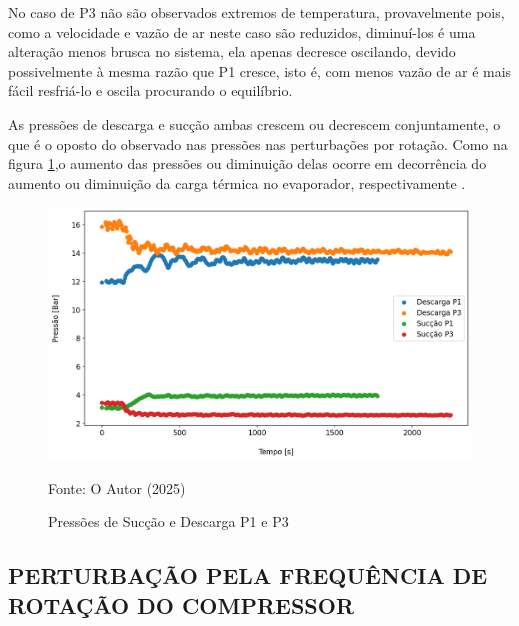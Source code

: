 No caso de P3 não são observados extremos de temperatura, provavelmente pois, como a velocidade e vazão de ar neste caso são reduzidos, diminuí-los é uma alteração menos brusca no sistema, ela apenas decresce oscilando, devido possivelmente à mesma razão que P1 cresce, isto é, com menos vazão de ar é mais fácil resfriá-lo e oscila procurando o equilíbrio.

As pressões de descarga e sucção ambas crescem ou decrescem conjuntamente, o que é o oposto do observado nas pressões nas perturbações por rotação. Como na figura \ref{fig:Pressões de Sucção e Descarga P1 e P3},o aumento das pressões ou diminuição delas ocorre em decorrência do aumento ou diminuição da carga térmica no evaporador, respectivamente \cite{EffectsOFRefrigeranteCompressorAirFlow}.

\begin{figure}[h]
    \centering
    \includegraphics[width=1\linewidth]{FigurasdoTexto/Pressões de Sucção e Descarga P1 e P3.png}
    \caption{Pressões de Sucção e Descarga P1 e P3}
    \label{fig:Pressões de Sucção e Descarga P1 e P3}
    {\footnotesize Fonte: O Autor (2025)}
\end{figure}

\subsection{\MakeUppercase{Perturbação pela Frequência de Rotação do Compressor}}\label{subsec:PertubaçãoRotacaoCompressor}


